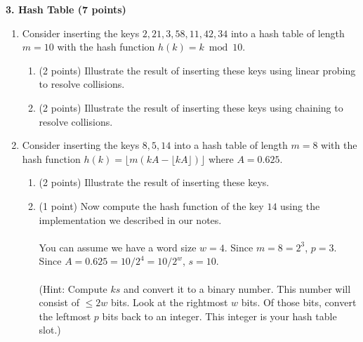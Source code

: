 \documentclass[12pt]{elsart}
\begin{document}
{\bf 3.  Hash Table (7 points)}

\begin{enumerate}
   \item Consider inserting the keys $2, 21, 3, 58, 11, 42, 34$ into a hash
table of length $m = 10$ with the hash function $h(k) = k \bmod 10$.
\begin{enumerate}
   \item (2 points)  Illustrate the result of inserting these keys using linear probing to resolve collisions.
   \item (2 points) Illustrate the result of inserting these keys using chaining to resolve collisions.
\end{enumerate}

   \item Consider inserting the keys $8,5,14$ into a hash
table of length $m = 8$ with the hash function $h(k) = \lfloor m(kA - \lfloor kA\rfloor)\rfloor$ where $A=0.625$.
\begin{enumerate}
   \item (2 points) Illustrate the result of inserting these keys.
   \item (1 point) Now compute the hash function of the key $14$ using the implementation we described in our notes.  
\\\\You can assume we have a word size $w=4$. Since $m=8=2^3$, $p=3$.  Since $A=0.625=10/2^4=10/2^w$, $s=10$.
\\\\(Hint: Compute $ks$ and convert it to a binary number.  This number will consist of $\leq 2w$ bits.  Look at the rightmost $w$ bits.  Of those bits, convert the leftmost $p$ bits back to an integer.  This integer is your hash table slot.)
\end{enumerate}


\end{enumerate}
\end{document}
